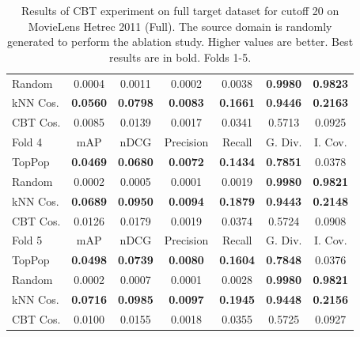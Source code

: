 \begin{table}[hbt]
\begin{tabulary}{\textwidth}{|L|CCCCCC|}
Random & 0.0004 &           0.0011 &           0.0002 &           0.0038 &                                  \textbf{0.9980} &                                   \textbf{0.9823} \\
kNN Cos. & \textbf{0.0560} &  \textbf{0.0798} &  \textbf{0.0083} &  \textbf{0.1661} &                                  \textbf{0.9446} &                                   \textbf{0.2163} \\
CBT Cos. & 0.0085 &           0.0139 &           0.0017 &           0.0341 &                                           0.5713 &                                            0.0925 \\
\hline
\hline
Fold 4 & mAP & nDCG & Precision & Recall & G. Div. & I. Cov. \\
\hline
TopPop & \textbf{0.0469} &  \textbf{0.0680} &  \textbf{0.0072} &  \textbf{0.1434} &                                  \textbf{0.7851} &                                            0.0378 \\
Random & 0.0002 &           0.0005 &           0.0001 &           0.0019 &                                  \textbf{0.9980} &                                   \textbf{0.9821} \\
kNN Cos. & \textbf{0.0689} &  \textbf{0.0950} &  \textbf{0.0094} &  \textbf{0.1879} &                                  \textbf{0.9443} &                                   \textbf{0.2148} \\
CBT Cos. & 0.0126 &           0.0179 &           0.0019 &           0.0374 &                                           0.5724 &                                            0.0908 \\
\hline
\hline
Fold 5 & mAP & nDCG & Precision & Recall & G. Div. & I. Cov. \\
\hline
TopPop & \textbf{0.0498} &  \textbf{0.0739} &  \textbf{0.0080} &  \textbf{0.1604} &                                  \textbf{0.7848} &                                            0.0376 \\
Random & 0.0002 &           0.0007 &           0.0001 &           0.0028 &                                  \textbf{0.9980} &                                   \textbf{0.9821} \\
kNN Cos. & \textbf{0.0716} &  \textbf{0.0985} &  \textbf{0.0097} &  \textbf{0.1945} &                                  \textbf{0.9448} &                                   \textbf{0.2156} \\
CBT Cos. & 0.0100 &           0.0155 &           0.0018 &           0.0355 &                                           0.5725 &                                            0.0927 \\
\hline
\end{tabulary}
\caption{Results of CBT experiment on full target dataset for cutoff 20 on MovieLens Hetrec 2011 (Full). The source domain is randomly generated to perform the ablation study. Higher values are better. Best results are in bold. Folds 1-5.}
\end{table}

